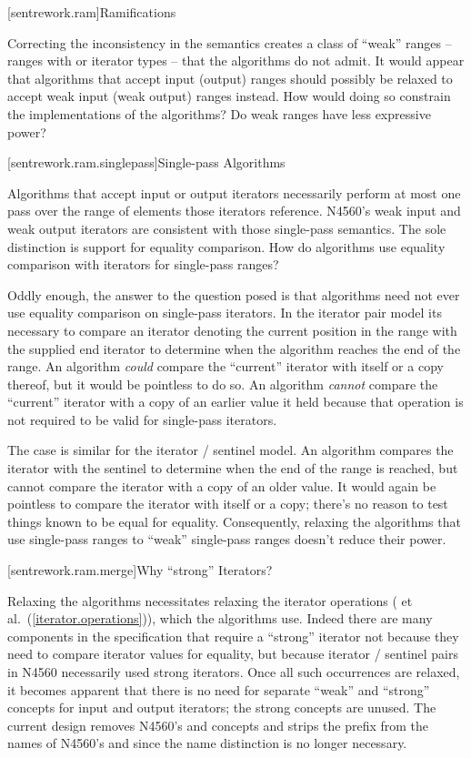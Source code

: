 [sentrework.ram]{Ramifications}

\pnum
Correcting the inconsistency in the  semantics creates a class
of ``weak'' ranges -- ranges with  or 
iterator types -- that the algorithms do not admit. It would appear that
algorithms that accept input (output) ranges should possibly be relaxed to
accept weak input (weak output) ranges instead. How would doing so constrain
the implementations of the algorithms? Do weak ranges have less expressive power?

[sentrework.ram.singlepass]{Single-pass Algorithms}

\pnum
Algorithms that accept input or output iterators necessarily perform at most one
pass over the range of elements those iterators reference. N4560's weak input and
weak output iterators are consistent with those single-pass semantics. The
sole distinction is support for equality comparison. How do algorithms use
equality comparison with iterators for single-pass ranges?

\pnum
Oddly enough, the answer to the question posed is that algorithms need not ever
use equality comparison on single-pass iterators. In the iterator pair model its
necessary to compare an iterator denoting the current position in the range with
the supplied end iterator to determine when the algorithm reaches the end of the
range. An algorithm \textit{could} compare the ``current'' iterator with itself
or a copy thereof, but it would be pointless to do so. An algorithm
\textit{cannot} compare the ``current'' iterator with a copy of an earlier value
it held because that operation is not required to be valid for single-pass
iterators.

\pnum
The case is similar for the iterator / sentinel model. An algorithm compares the
iterator with the sentinel to determine when the end of the range is reached,
but cannot compare the iterator with a copy of an older value. It would again be
pointless to compare the iterator with itself or a copy; there's no reason to
test things known to be equal for equality. Consequently, relaxing the
algorithms that use single-pass ranges to ``weak'' single-pass ranges doesn't
reduce their power.

[sentrework.ram.merge]{Why ``strong'' Iterators?}

\pnum
Relaxing the algorithms necessitates relaxing the iterator operations
( et al.~(\ref{iterator.operations})), which the algorithms use.
Indeed there are many components in the specification that require a ``strong''
iterator not because they need to compare iterator values for equality, but
because iterator / sentinel pairs in N4560 necessarily used strong iterators.
Once all such occurrences are relaxed, it becomes apparent that there is no need
for separate ``weak'' and ``strong'' concepts for input and output iterators;
the strong concepts are unused. The current design removes N4560's
 and  concepts and strips the
 prefix from the names of N4560's  and
 since the name distinction is no longer necessary.

